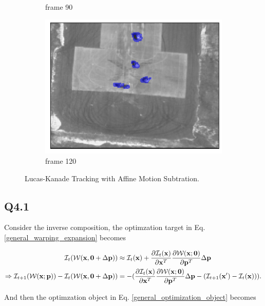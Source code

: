 \documentclass[11pt]{article}
\begin{document}
\begin{figure}[h!]
\begin{subfigure}{.24\textwidth}
      \caption{frame 90}
    \end{subfigure}
    \begin{subfigure}{.24\textwidth}
      \centering
      \includegraphics[width=.8\linewidth]{../results/aerialseq_119.png}
      \caption{frame 120}
    \end{subfigure}
    \caption{Lucas-Kanade Tracking with Affine Motion Subtration.}
    \label{fig:q3.3}
\end{figure}

\newpage
\subsection*{Q4.1}

Consider the inverse composition, the optimzation target in Eq. \ref{general_warping_expansion} becomes

\begin{align}
    \mathcal{I}_t(\mathcal{W}(\mathbf{x}, \mathbf{0}+\Delta \mathbf{p})) & \approx
    \mathcal{I}_t (\mathbf{x}) +
    \frac{\partial \mathcal{I}_{t}(\mathbf{x})}{\partial\mathbf{x}^T}
    \frac{\partial \mathcal{W}(\mathbf{x}; \mathbf{0})} {\partial \mathbf{p}^T} \Delta \mathbf{p} \\
    \Rightarrow
    \mathcal{I}_{t+1}(\mathcal{W}(\mathbf{x};\mathbf{p}))-\mathcal{I}_t(\mathcal{W}(\mathbf{x}, \mathbf{0}+\Delta \mathbf{p})) &=
    -(\frac{\partial \mathcal{I}_{t}(\mathbf{x})}{\partial\mathbf{x}^T}
    \frac{\partial \mathcal{W}(\mathbf{x}; \mathbf{0})} {\partial \mathbf{p}^T} \Delta \mathbf{p}
    - (\mathcal{I}_{t+1}(\mathbf{x}') - \mathcal{I}_t(\mathbf{x})) ).
\end{align}

And then the optimzation object in Eq. \ref{general_optimization_object} becomes
\end{document}
